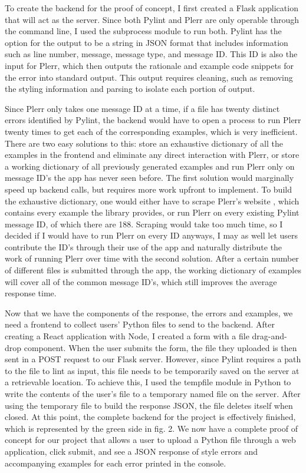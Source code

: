 \documentclass[10pt,twocolumn]{article}
\begin{document}
To create the backend for the proof of concept, I first created a Flask application that will act as the server. 
Since both Pylint and Plerr are only operable through the command line, I used the subprocess module to run both. 
Pylint has the option for the output to be a string in JSON format that includes information such as line number, message, message type, and message ID. 
This ID is also the input for Plerr, which then outputs the rationale and example code snippets for the error into standard output. 
This output requires cleaning, such as removing the styling information and parsing to isolate each portion of output. 

Since Plerr only takes one message ID at a time, if a file has twenty distinct errors identified by Pylint, the backend would have to open a process to run Plerr twenty times to get each of the corresponding examples, which is very inefficient. 
There are two easy solutions to this: store an exhaustive dictionary of all the examples in the frontend and eliminate any direct interaction with Plerr, or store a working dictionary of all previously generated examples and run Plerr only on message ID's the app has never seen before. 
The first solution would marginally speed up backend calls, but requires more work upfront to implement. 
To build the exhaustive dictionary, one would either have to scrape Plerr's website \cite{plerr}, which contains every example the library provides, or run Plerr on every existing Pylint message ID, of which there are 188. 
Scraping would take too much time, so I decided if I would have to run Plerr on every ID anyways, I may as well let users contribute the ID's through their use of the app and naturally distribute the work of running Plerr over time with the second solution. 
After a certain number of different files is submitted through the app, the working dictionary of examples will cover all of the common message ID's, which still improves the average response time. 

Now that we have the components of the response, the errors and examples, we need a frontend to collect users' Python files to send to the backend. 
After creating a React application with Node, I created a form with a file drag-and-drop component. 
When the user submits the form, the file they uploaded is then sent in a POST request to our Flask server. 
However, since Pylint requires a path to the file to lint as input, this file needs to be temporarily saved on the server at a retrievable location. 
To achieve this, I used the tempfile module in Python to write the contents of the user's file to a temporary named file on the server. 
After using the temporary file to build the response JSON, the file deletes itself when closed. 
At this point, the complete backend for the project is effectively finished, which is represented by the green side in fig. 2. 
We now have a complete proof of concept for our project that allows a user to upload a Python file through a web application, click submit, and see a JSON response of style errors and accompanying examples for each error printed in the console. 
\end{document}
